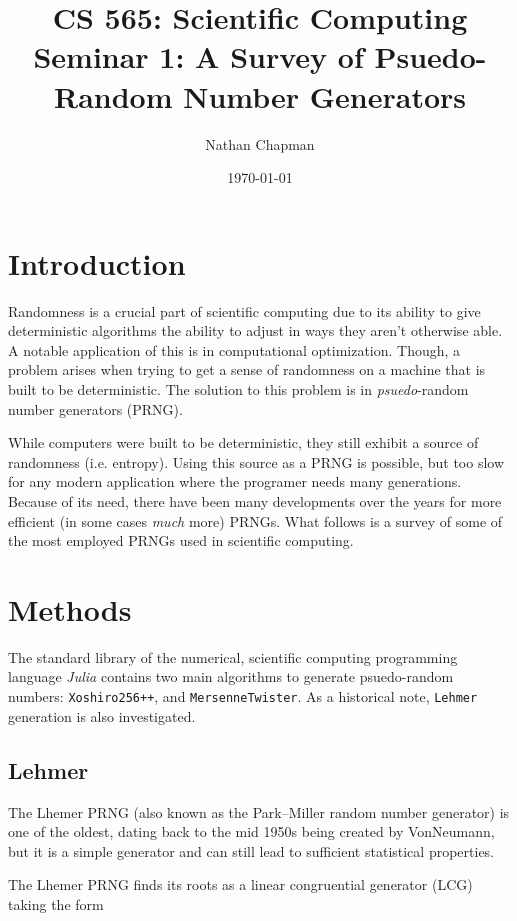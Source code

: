 \documentclass{article}
\title{\vspace*{-0.625in}CS 565: Scientific Computing \\ Seminar 1: A Survey of Psuedo-Random Number Generators}
\author{Nathan Chapman}
\date{\today}
\begin{document}
    \maketitle

    \section*{Introduction}

        Randomness is a crucial part of scientific computing due to its ability to give deterministic algorithms the ability to adjust in ways they aren't otherwise able.  A notable application of this is in computational optimization.  Though, a problem arises when trying to get a sense of randomness on a machine that is built to be deterministic.  The solution to this problem is in \emph{psuedo}-random number generators (PRNG).

        While computers were built to be deterministic, they still exhibit a source of randomness (i.e. entropy).  Using this source as a PRNG is possible, but too slow for any modern application where the programer needs many generations\cite{WhyNotRandomDevice}.  Because of its need, there have been many developments over the years for more efficient (in some cases \emph{much} more) PRNGs.  What follows is a survey of some of the most employed PRNGs used in scientific computing.
    
    \section*{Methods}

        The standard library of the numerical, scientific computing programming language \emph{Julia} contains two main algorithms to generate psuedo-random numbers\cite{Julia-2017}: \texttt{Xoshiro256++}, and \texttt{MersenneTwister}.  As a historical note, \texttt{Lehmer} generation is also investigated.

        \subsection*{Lehmer}

            The Lhemer PRNG (also known as the Park–Miller random number generator) is one of the oldest, dating back to the mid 1950s being created by VonNeumann, but it is a simple generator and can still lead to sufficient statistical properties.

            The Lhemer PRNG finds its roots as a linear congruential generator (LCG) taking the form
\end{document}
